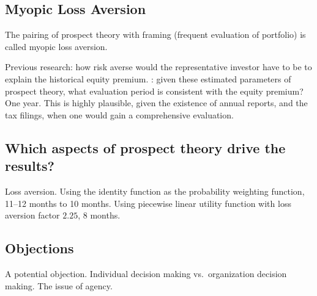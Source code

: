 \documentclass[oneside,reqno,letterpaper]{amsart}
\begin{document}
\subsection{Myopic Loss Aversion}
The pairing of prospect theory with framing (frequent evaluation of portfolio) is called myopic loss aversion. 

Previous research: how risk averse would the representative investor have to be to explain the historical equity premium. 
\Textcite{Benartzi1995Myopic}: given these estimated parameters of prospect theory, what evaluation period is consistent with the equity premium? 
One year. This is highly plausible, given the existence of annual reports, and the tax filings, when one would gain a comprehensive evaluation. 


\subsection{Which aspects of prospect theory drive the results?}
Loss aversion. 
Using the identity function as the probability weighting function, 11--12 months to 10 months. 
Using piecewise linear utility function with loss aversion factor \(2.25\), 8 months.


\subsection{Objections}
A potential objection. 
Individual decision making vs.\ organization decision making. 
The issue of agency. 


\printbibliography
\end{document}
